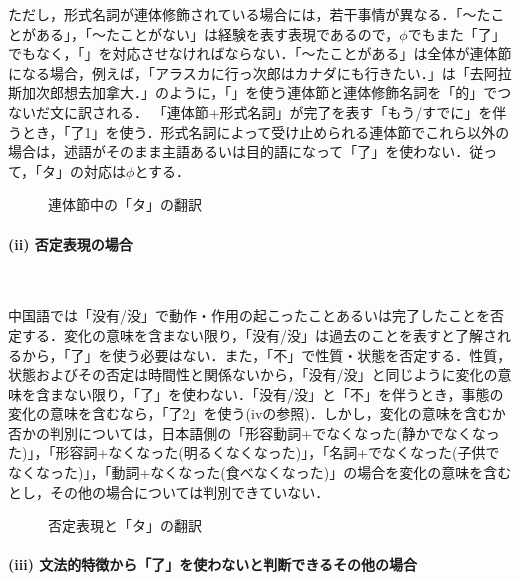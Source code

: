 ただし，形式名詞が連体修飾されている場合には，若干事情が異なる．「〜たことがある」，「〜たことがない」は経験を表す表現であるので，$\phi$でもまた「了」でもなく，「」を対応させなければならない．「〜たことがある」は全体が連体節になる場合，例えば，「アラスカに行っ次郎はカナダにも行きたい．」は「去阿拉斯加次郎想去加拿大．」のように，「」を使う連体節と連体修飾名詞を「的」でつないだ文に訳される．
「連体節+形式名詞」が完了を表す「もう/すでに」を伴うとき，「了1」を使う．形式名詞によって受け止められる連体節でこれら以外の場合は，述語がそのまま主語あるいは目的語になって「了」を使わない．従って，「タ」の対応は$\phi$とする．

\begin{figure}[hbtp]
\begin{center}
\caption{連体節中の「タ」の翻訳}
\label{fig:1}
\end{center}
\end{figure}

\paragraph{(ii) 否定表現の場合}　

中国語では「没有/没」で動作・作用の起こったことあるいは完了したことを否定する．変化の意味を含まない限り，「没有/没」は過去のことを表すと了解されるから，「了」を使う必要はない．また，「不」で性質・状態を否定する．性質，状態およびその否定は時間性と関係ないから，「没有/没」と同じように変化の意味を含まない限り，「了」を使わない．「没有/没」と「不」を伴うとき，事態の変化の意味を含むなら，「了2」を使う(ivの参照)．しかし，変化の意味を含むか否かの判別については，日本語側の「形容動詞+でなくなった(静かでなくなった)」，「形容詞+なくなった(明るくなくなった)」，「名詞+でなくなった(子供でなくなった)」，「動詞+なくなった(食べなくなった)」の場合を変化の意味を含むとし，その他の場合については判別できていない．

\begin{figure}[hbtp]
\begin{center}
\caption{否定表現と「タ」の翻訳}
\label{fig:2}
\end{center}
\end{figure}

\paragraph{(iii) 文法的特徴から「了」を使わないと判断できるその他の場合}　

